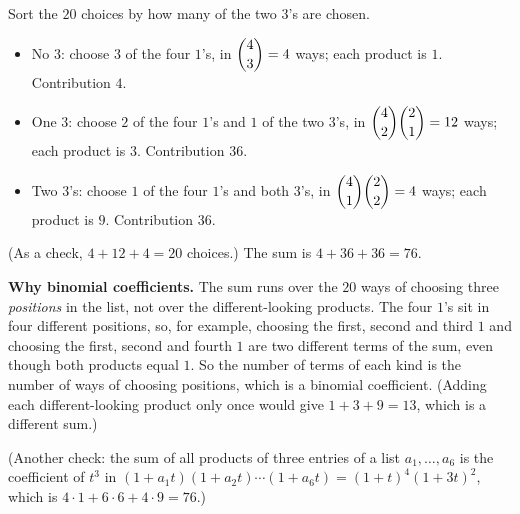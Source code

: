 Sort the $20$ choices by how many of the two $3$'s are chosen.
\begin{itemize}
\item No $3$: choose $3$ of the four $1$'s, in $\dbinom43=4$ ways; each product is $1$. Contribution $4$.
\item One $3$: choose $2$ of the four $1$'s and $1$ of the two $3$'s, in $\dbinom42\dbinom21=12$ ways; each product is $3$. Contribution $36$.
\item Two $3$'s: choose $1$ of the four $1$'s and both $3$'s, in $\dbinom41\dbinom22=4$ ways; each product is $9$. Contribution $36$.
\end{itemize}
(As a check, $4+12+4=20$ choices.) The sum is $4+36+36=\boxed{76}$.

\textbf{Why binomial coefficients.} The sum runs over the $20$ ways of choosing three \emph{positions} in the list, not over the different-looking products. The four $1$'s sit in four different positions, so, for example, choosing the first, second and third $1$ and choosing the first, second and fourth $1$ are two different terms of the sum, even though both products equal $1$. So the number of terms of each kind is the number of ways of choosing positions, which is a binomial coefficient. (Adding each different-looking product only once would give $1+3+9=13$, which is a different sum.)

(Another check: the sum of all products of three entries of a list $a_1,\dots,a_6$ is the coefficient of $t^3$ in $(1+a_1t)(1+a_2t)\cdots(1+a_6t)=(1+t)^4(1+3t)^2$, which is $4\cdot1+6\cdot6+4\cdot9=76$.)
